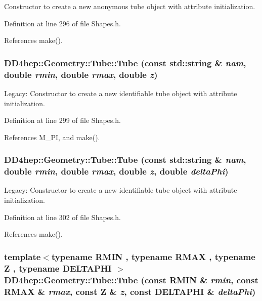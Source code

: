 Constructor to create a new anonymous tube object with attribute initialization. 

Definition at line 296 of file Shapes.h.

References make().\hypertarget{class_d_d4hep_1_1_geometry_1_1_tube_ae031124eb6636f34a07965ca7615c7fa}{
\subsubsection[{Tube}]{\setlength{\rightskip}{0pt plus 5cm}DD4hep::Geometry::Tube::Tube (const std::string \& {\em nam}, \/  double {\em rmin}, \/  double {\em rmax}, \/  double {\em z})}}
\label{class_d_d4hep_1_1_geometry_1_1_tube_ae031124eb6636f34a07965ca7615c7fa}


Legacy: Constructor to create a new identifiable tube object with attribute initialization. 

Definition at line 299 of file Shapes.h.

References M\_\-PI, and make().\hypertarget{class_d_d4hep_1_1_geometry_1_1_tube_a30ea96e53731054bcad134f3734aa958}{
\subsubsection[{Tube}]{\setlength{\rightskip}{0pt plus 5cm}DD4hep::Geometry::Tube::Tube (const std::string \& {\em nam}, \/  double {\em rmin}, \/  double {\em rmax}, \/  double {\em z}, \/  double {\em deltaPhi})}}
\label{class_d_d4hep_1_1_geometry_1_1_tube_a30ea96e53731054bcad134f3734aa958}


Legacy: Constructor to create a new identifiable tube object with attribute initialization. 

Definition at line 302 of file Shapes.h.

References make().\hypertarget{class_d_d4hep_1_1_geometry_1_1_tube_a31edf719befad87e4539c4964a155cd2}{
\subsubsection[{Tube}]{\setlength{\rightskip}{0pt plus 5cm}template$<$typename RMIN , typename RMAX , typename Z , typename DELTAPHI $>$ DD4hep::Geometry::Tube::Tube (const RMIN \& {\em rmin}, \/  const RMAX \& {\em rmax}, \/  const Z \& {\em z}, \/  const DELTAPHI \& {\em deltaPhi})}}
\label{class_d_d4hep_1_1_geometry_1_1_tube_a31edf719befad87e4539c4964a155cd2}


